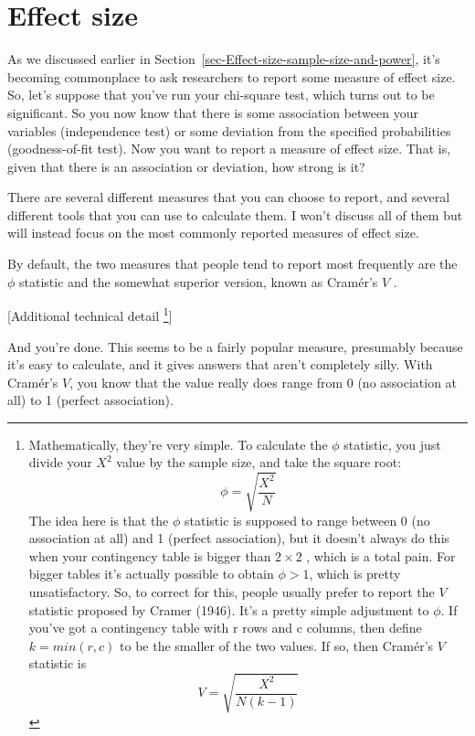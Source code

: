 \documentclass[
  a4paper,
]{book}
\begin{document}
\hypertarget{effect-size}{%
\section{Effect size}\label{effect-size}}

As we discussed earlier in
Section~\ref{sec-Effect-size-sample-size-and-power}, it's becoming
commonplace to ask researchers to report some measure of effect size.
So, let's suppose that you've run your chi-square test, which turns out
to be significant. So you now know that there is some association
between your variables (independence test) or some deviation from the
specified probabilities (goodness-of-fit test). Now you want to report a
measure of effect size. That is, given that there is an association or
deviation, how strong is it?

There are several different measures that you can choose to report, and
several different tools that you can use to calculate them. I won't
discuss all of them but will instead focus on the most commonly reported
measures of effect size.

By default, the two measures that people tend to report most frequently
are the \(\phi\) statistic and the somewhat superior version, known as
Cramér's \(V\) .

{[}Additional technical detail \footnote{Mathematically, they're very
  simple. To calculate the \(\phi\) statistic, you just divide your
  \(X^2\) value by the sample size, and take the square root:
  \[\phi=\sqrt{\frac{X^2}{N}}\] The idea here is that the \(\phi\)
  statistic is supposed to range between 0 (no association at all) and 1
  (perfect association), but it doesn't always do this when your
  contingency table is bigger than \(2 \times 2\) , which is a total
  pain. For bigger tables it's actually possible to obtain \(\phi > 1\),
  which is pretty unsatisfactory. So, to correct for this, people
  usually prefer to report the \(V\) statistic proposed by Cramer
  (1946). It's a pretty simple adjustment to \(\phi\). If you've got a
  contingency table with r rows and c columns, then define
  \(k = min(r, c)\) to be the smaller of the two values. If so, then
  Cramér's \(V\) statistic is \[V=\sqrt{\frac{X^2}{N(k-1)}}\]}{]}

And you're done. This seems to be a fairly popular measure, presumably
because it's easy to calculate, and it gives answers that aren't
completely silly. With Cramér's \(V\), you know that the value really
does range from 0 (no association at all) to 1 (perfect association).
\end{document}
